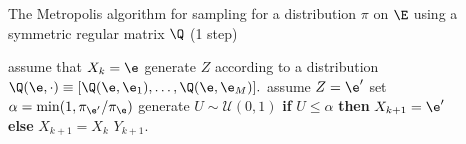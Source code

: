 \documentclass[a4paper,12pt]{article}
\begin{document}
     
 
\begin{algorithm}[H]
\caption{The  Metropolis algorithm for sampling for a distribution  $\pi$ on $\E$ 
using a symmetric regular matrix $\Q$ (1 step)} 
\label{alg:metropolis}
\begin{algorithmic}[1] 
 
\STATE assume that  $X_k=\e$
\STATE generate $Z$ according to a distribution  $\Q(\e,\cdot)\equiv [\Q(\e,\e_1),\ldots,\Q(\e,\e_M)].$
\STATE assume $Z=\e'$
\STATE set   $\alpha=\min(1,\pi_{\e'}/\pi_\e)$ %
\STATE generate $U\sim \mathcal{U}(0,1)$
\STATE \textbf{if} $U\leq \alpha$ \textbf{then} $X_{k+1}=\e'$
\STATE $\qquad \qquad $ \textbf{else}  $X_{k+1}=X_k$
\RETURN $Y_{k+1}$.
\end{algorithmic}
\end{algorithm}
\end{document}
